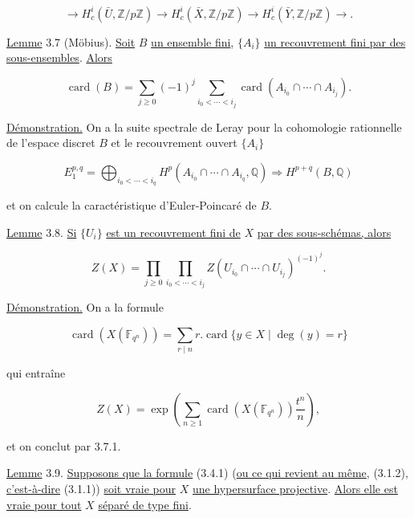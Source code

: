 \begin{equation}\tag{3.6.2}
\longrightarrow H_c^i(\bar U,\mathbb Z/p\mathbb Z)
\longrightarrow H_c^i(\bar X,\mathbb Z/p\mathbb Z)
\longrightarrow H_c^i(\bar Y,\mathbb Z/p\mathbb Z)\longrightarrow.
\end{equation}


\underline{Lemme} 3.7 (Möbius). \underline{Soit} $B$ \underline{un ensemble fini},
$\{A_i\}$ \underline{un recouvrement fini par des sous-ensembles}. \underline{Alors}

\begin{equation}\tag{3.7.1}
\operatorname{card}(B)=
\sum_{j\geq0}(-1)^j
\sum_{i_0<\cdots<i_j}
\operatorname{card}(A_{i_0}\cap\cdots\cap A_{i_j}).
\end{equation}

\underline{Démonstration.} On a la suite spectrale de Leray pour la
cohomologie rationnelle de l'espace discret $B$ et le recouvrement ouvert
$\{A_i\}$

\[
E_1^{p,q}=\bigoplus_{i_0<\cdots<i_q}
H^p(A_{i_0}\cap\cdots\cap A_{i_q},\mathbb Q)
\Longrightarrow H^{p+q}(B,\mathbb Q)
\]

et on calcule la caractéristique d'Euler-Poincaré de $B$.

\underline{Lemme} 3.8. \underline{Si} $\{U_i\}$ \underline{est un recouvrement fini de}
$X$ \underline{par des sous-schémas, alors}

\begin{equation}\tag{3.8.1}
Z(X)=
\prod_{j\geq0}
\prod_{i_0<\cdots<i_j}
Z(U_{i_0}\cap\cdots\cap U_{i_j})^{(-1)^j}.
\end{equation}

\underline{Démonstration.} On a la formule

\begin{equation}\tag{3.8.2}
\operatorname{card}(X(\mathbb F_{q^n}))
=\sum_{r\mid n}r.\operatorname{card}\{y\in X\mid\deg(y)=r\}
\end{equation}

qui entraîne

\begin{equation}\tag{3.8.3}
Z(X)=\exp\!\left(
\sum_{n\geq1}\operatorname{card}(X(\mathbb F_{q^n}))\frac{t^n}{n}
\right),
\end{equation}

et on conclut par 3.7.1.

\underline{Lemme} 3.9. \underline{Supposons que la formule} (3.4.1) (\underline{ou ce qui
revient au même}, (3.1.2), \underline{c'est-à-dire} (3.1.1)) \underline{soit vraie pour} $X$ \underline{une
hypersurface projective}. \underline{Alors elle est vraie pour tout} $X$ \underline{séparé de type
fini}.

